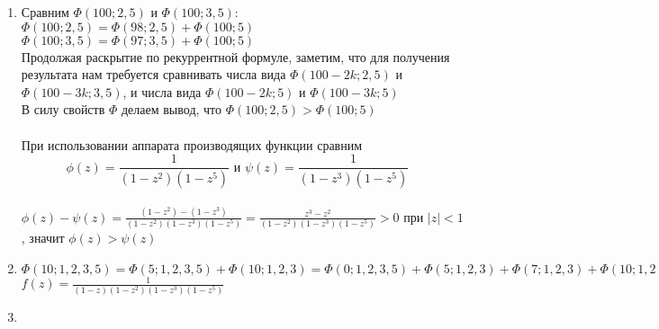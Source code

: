 
\begin{enumerate}
  \item
    Сравним $\Phi(100;2,5)$ и $\Phi(100;3,5)$:\\
    $\Phi(100;2,5) = \Phi(98;2,5) + \Phi(100; 5)$\\
    $\Phi(100;3,5) = \Phi(97;3,5) + \Phi(100; 5)$\\
    Продолжая раскрытие по рекуррентной формуле, заметим, что для получения результата нам требуется сравнивать числа вида $\Phi(100-2k;2,5)$ и $\Phi(100-3k;3,5)$, и числа вида $\Phi(100-2k;5)$ и $\Phi(100-3k;5)$\\
    В силу свойств $\Phi$ делаем вывод, что $\Phi(100;2,5) > \Phi(100;5)$\\ \\
    При использовании аппарата производящих функции сравним $$\phi(z)=\frac{1}{(1-z^2)(1-z^5)} \text{ и } \psi(z)=\frac{1}{(1-z^3)(1-z^5)}$$\\
    $\phi(z) - \psi(z) = \frac{(1-z^2) - (1-z^3)}{(1-z^2)(1-z^3)(1-z^5)} = \frac{z^3-z^2}{(1-z^2)(1-z^3)(1-z^5)} > 0 \text{ при } |z| < 1$,
    значит $\phi(z) > \psi(z)$
    
  \item
    $\Phi(10; 1,2,3,5) = \Phi(5; 1,2,3,5) + \Phi(10; 1,2,3) = \Phi(0; 1,2,3,5) + \Phi(5; 1,2,3) + \Phi(7; 1,2,3) + \Phi(10; 1,2) = 1 + \Phi(2; 1,2,3) + \Phi(5; 1,2) + \Phi(4; 1,2,3) + \Phi(7; 1,2) + \Phi(8; 1,2) + \Phi(10; 1) = 2 + \Phi(2; 1,2) + \Phi(3; 1,2) + \Phi(5; 1) + \Phi(1; 1,2,3) + \Phi(4; 1,2) + \Phi(5; 1,2) + \Phi(7; 1) + \Phi(6; 1,2) + \Phi(8; 1) = 20$\\
    $f(z) = \frac{1}{(1-z)(1-z^2)(1-z^3)(1-z^5)}$
    
  \item
\end{enumerate}
